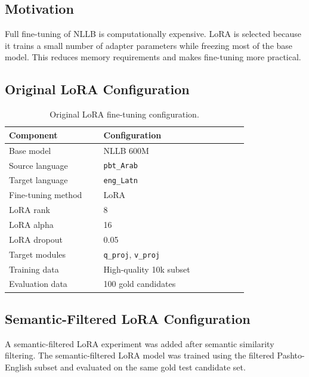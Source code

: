 \documentclass[conference]{IEEEtran}
\begin{document}
\subsection{Motivation}

Full fine-tuning of NLLB is computationally expensive. LoRA is selected because it trains a small number of adapter parameters while freezing most of the base model. This reduces memory requirements and makes fine-tuning more practical.

\subsection{Original LoRA Configuration}

\begin{table}[H]
\centering
\caption{Original LoRA fine-tuning configuration.}
\footnotesize
\begin{tabular}{p{0.34\linewidth}p{0.52\linewidth}}
\toprule
\textbf{Component} & \textbf{Configuration} \\
\midrule
Base model & NLLB 600M \\
Source language & \texttt{pbt\_Arab} \\
Target language & \texttt{eng\_Latn} \\
Fine-tuning method & LoRA \\
LoRA rank & 8 \\
LoRA alpha & 16 \\
LoRA dropout & 0.05 \\
Target modules & \texttt{q\_proj}, \texttt{v\_proj} \\
Training data & High-quality 10k subset \\
Evaluation data & 100 gold candidates \\
\bottomrule
\end{tabular}
\end{table}

\subsection{Semantic-Filtered LoRA Configuration}

A semantic-filtered LoRA experiment was added after semantic similarity filtering. The semantic-filtered LoRA model was trained using the filtered Pashto-English subset and evaluated on the same gold test candidate set.
\end{document}
